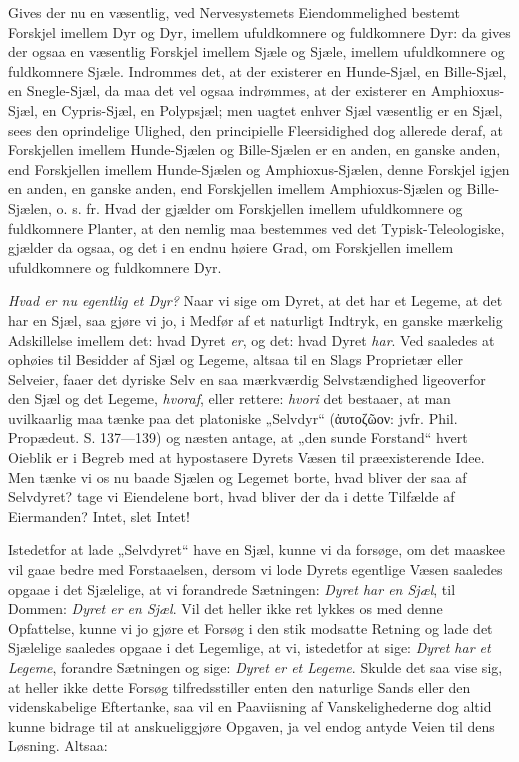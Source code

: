 \documentclass[11pt]{book}
\newcommand{\opage}[1]{\marginnote{\footnotesize\textit{[#1]}}}
\begin{document}
Gives der nu en væsentlig, ved Nervesystemets Eiendommelighed bestemt
Forskjel imellem Dyr og Dyr, imellem ufuldkomnere og fuldkomnere Dyr:
da gives der ogsaa en væsentlig Forskjel imellem Sjæle og Sjæle,
imellem ufuldkomnere og fuldkomnere Sjæle. Indrommes det, at der
existerer en Hunde-Sjæl, en Bille-Sjæl, en Snegle-Sjæl, da maa det
vel ogsaa indrømmes, at der existerer en Amphioxus-Sjæl, en
Cypris-Sjæl, en Polypsjæl; men uagtet enhver Sjæl væsentlig er en
Sjæl, sees den oprindelige Ulighed, den principielle Fleersidighed
dog allerede deraf, at Forskjellen imellem Hunde-Sjælen og
Bille-Sjælen er en anden, en ganske anden, end Forskjellen imellem
Hunde-Sjælen og Amphioxus-Sjælen, denne Forskjel igjen en anden, en
ganske anden, end Forskjellen imellem Amphioxus-Sjælen og
Bille-Sjælen, o. s. fr. Hvad der gjælder om Forskjellen imellem
ufuldkomnere og fuldkomnere Planter, at den nemlig maa bestemmes ved
det Typisk-Teleologiske, gjælder da ogsaa, og det i en endnu høiere
Grad, om Forskjellen imellem ufuldkomnere og fuldkomnere Dyr.

\emph{Hvad er nu egentlig et Dyr?} Naar vi sige om Dyret, at det har
et Legeme, at det har en Sjæl, saa gjøre vi jo, i Medfør af et
naturligt Indtryk, en ganske mærkelig Adskillelse imellem det: hvad
Dyret \emph{er}, og det: hvad Dyret \emph{har}. Ved saaledes at
ophøies til Besidder af Sjæl og Legeme, altsaa til en Slags
Proprietær eller Selveier, faaer det dyriske Selv en saa mærkværdig
Selvstændighed ligeoverfor den Sjæl og det Legeme,
\emph{hvoraf}, eller rettere: \emph{hvori} det bestaaer, at man
uvilkaarlig maa tænke paa det platoniske
\opage{380} \setcounter{footnote}{0}%
„Selvdyr“ (ἀυτοζῶον: jvfr. Phil. Propædeut. S. 137---139) og næsten
antage, at „den sunde Forstand“ hvert Oieblik er i Begreb med at
hypostasere Dyrets Væsen til præexisterende Idee. Men tænke vi os nu
baade Sjælen og Legemet borte, hvad bliver der saa af Selvdyret? tage
vi Eiendelene bort, hvad bliver der da i dette Tilfælde af
Eiermanden? Intet, slet Intet!

Istedetfor at lade „Selvdyret“ have en Sjæl, kunne vi da forsøge, om
det maaskee vil gaae bedre med Forstaaelsen, dersom vi lode Dyrets
egentlige Væsen saaledes opgaae i det Sjælelige, at vi forandrede
Sætningen: \emph{Dyret har en Sjæl}, til Dommen: \emph{Dyret er en
Sjæl}. Vil det heller ikke ret lykkes os med denne Opfattelse, kunne
vi jo gjøre et Forsøg i den stik modsatte Retning og lade det
Sjælelige saaledes opgaae i det Legemlige, at vi, istedetfor at sige:
\emph{Dyret har et Legeme}, forandre Sætningen og sige: \emph{Dyret
er et Legeme}. Skulde det saa vise sig, at heller ikke dette Forsøg
tilfredsstiller enten den naturlige Sands eller den videnskabelige
Eftertanke, saa vil en Paaviisning af Vanskelighederne dog altid
kunne bidrage til at anskueliggjøre Opgaven, ja vel endog antyde
Veien til dens Løsning. Altsaa:
\end{document}
